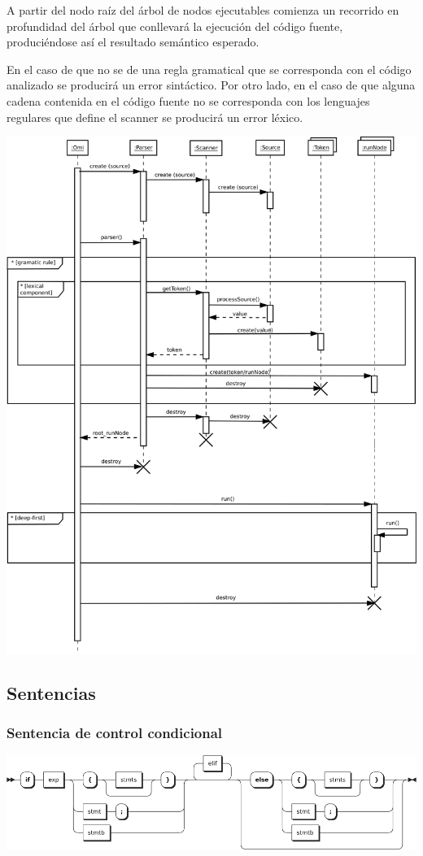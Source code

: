 A partir del nodo raíz del árbol de nodos ejecutables comienza un recorrido en profundidad del
árbol que conllevará la ejecución del código fuente, produciéndose así el resultado semántico 
esperado.

En el caso de que no se de una regla gramatical que se corresponda con el código analizado se 
producirá un error sintáctico. Por otro lado, en el caso de que alguna cadena contenida
en el código fuente no se corresponda con los lenguajes regulares que define el scanner
se producirá un error léxico.


\begin{center}
\includegraphics[scale=0.32]{interaction.png} \\
\end{center}

\subsection{Sentencias}
\subsubsection {Sentencia de control condicional }
\begin{center}
\includegraphics[scale=0.38]{if.png} \\
\end{center}

